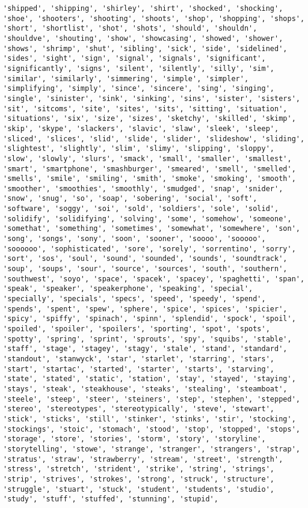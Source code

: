 \documentclass[11pt]{article}
\begin{document}
\begin{Verbatim}[commandchars=\\\{\}]
'shipped', 'shipping', 'shirley', 'shirt', 'shocked', 'shocking', 'shoe', 'shooters', 'shooting', 'shoots', 'shop', 'shopping', 'shops', 'short', 'shortlist', 'shot', 'shots', 'should', 'shouldn', 'shouldve', 'shouting', 'show', 'showcasing', 'showed', 'shower', 'shows', 'shrimp', 'shut', 'sibling', 'sick', 'side', 'sidelined', 'sides', 'sight', 'sign', 'signal', 'signals', 'significant', 'significantly', 'signs', 'silent', 'silently', 'silly', 'sim', 'similar', 'similarly', 'simmering', 'simple', 'simpler', 'simplifying', 'simply', 'since', 'sincere', 'sing', 'singing', 'single', 'sinister', 'sink', 'sinking', 'sins', 'sister', 'sisters', 'sit', 'sitcoms', 'site', 'sites', 'sits', 'sitting', 'situation', 'situations', 'six', 'size', 'sizes', 'sketchy', 'skilled', 'skimp', 'skip', 'skype', 'slackers', 'slavic', 'slaw', 'sleek', 'sleep', 'sliced', 'slices', 'slid', 'slide', 'slider', 'slideshow', 'sliding', 'slightest', 'slightly', 'slim', 'slimy', 'slipping', 'sloppy', 'slow', 'slowly', 'slurs', 'smack', 'small', 'smaller', 'smallest', 'smart', 'smartphone', 'smashburger', 'smeared', 'smell', 'smelled', 'smells', 'smile', 'smiling', 'smith', 'smoke', 'smoking', 'smooth', 'smoother', 'smoothies', 'smoothly', 'smudged', 'snap', 'snider', 'snow', 'snug', 'so', 'soap', 'sobering', 'social', 'soft', 'software', 'soggy', 'soi', 'sold', 'soldiers', 'sole', 'solid', 'solidify', 'solidifying', 'solving', 'some', 'somehow', 'someone', 'somethat', 'something', 'sometimes', 'somewhat', 'somewhere', 'son', 'song', 'songs', 'sony', 'soon', 'sooner', 'soooo', 'sooooo', 'soooooo', 'sophisticated', 'sore', 'sorely', 'sorrentino', 'sorry', 'sort', 'sos', 'soul', 'sound', 'sounded', 'sounds', 'soundtrack', 'soup', 'soups', 'sour', 'source', 'sources', 'south', 'southern', 'southwest', 'soyo', 'space', 'spacek', 'spacey', 'spaghetti', 'span', 'speak', 'speaker', 'speakerphone', 'speaking', 'special', 'specially', 'specials', 'specs', 'speed', 'speedy', 'spend', 'spends', 'spent', 'spew', 'sphere', 'spice', 'spices', 'spicier', 'spicy', 'spiffy', 'spinach', 'spinn', 'splendid', 'spock', 'spoil', 'spoiled', 'spoiler', 'spoilers', 'sporting', 'spot', 'spots', 'spotty', 'spring', 'sprint', 'sprouts', 'spy', 'squibs', 'stable', 'staff', 'stage', 'stagey', 'stagy', 'stale', 'stand', 'standard', 'standout', 'stanwyck', 'star', 'starlet', 'starring', 'stars', 'start', 'startac', 'started', 'starter', 'starts', 'starving', 'state', 'stated', 'static', 'station', 'stay', 'stayed', 'staying', 'stays', 'steak', 'steakhouse', 'steaks', 'stealing', 'steamboat', 'steele', 'steep', 'steer', 'steiners', 'step', 'stephen', 'stepped', 'stereo', 'stereotypes', 'stereotypically', 'steve', 'stewart', 'stick', 'sticks', 'still', 'stinker', 'stinks', 'stir', 'stocking', 'stockings', 'stoic', 'stomach', 'stood', 'stop', 'stopped', 'stops', 'storage', 'store', 'stories', 'storm', 'story', 'storyline', 'storytelling', 'stowe', 'strange', 'stranger', 'strangers', 'strap', 'stratus', 'straw', 'strawberry', 'stream', 'street', 'strength', 'stress', 'stretch', 'strident', 'strike', 'string', 'strings', 'strip', 'strives', 'strokes', 'strong', 'struck', 'structure', 'struggle', 'stuart', 'stuck', 'student', 'students', 'studio', 'study', 'stuff', 'stuffed', 'stunning', 'stupid', 
\end{Verbatim}
\end{document}
